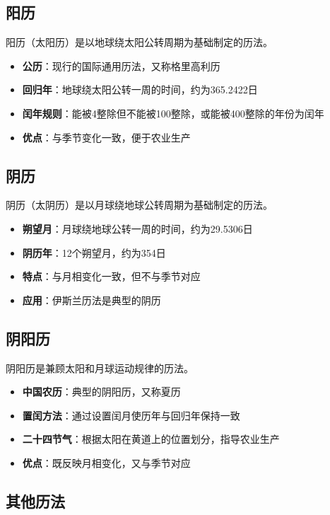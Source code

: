 \documentclass[12pt,UTF8]{ctexbook}
\begin{document}
\subsection{阳历}

阳历（太阳历）是以地球绕太阳公转周期为基础制定的历法。

\begin{itemize}
  \item \textbf{公历}：现行的国际通用历法，又称格里高利历
  \item \textbf{回归年}：地球绕太阳公转一周的时间，约为365.2422日
  \item \textbf{闰年规则}：能被4整除但不能被100整除，或能被400整除的年份为闰年
  \item \textbf{优点}：与季节变化一致，便于农业生产
\end{itemize}

\subsection{阴历}

阴历（太阴历）是以月球绕地球公转周期为基础制定的历法。

\begin{itemize}
  \item \textbf{朔望月}：月球绕地球公转一周的时间，约为29.5306日
  \item \textbf{阴历年}：12个朔望月，约为354日
  \item \textbf{特点}：与月相变化一致，但不与季节对应
  \item \textbf{应用}：伊斯兰历法是典型的阴历
\end{itemize}

\subsection{阴阳历}

阴阳历是兼顾太阳和月球运动规律的历法。

\begin{itemize}
  \item \textbf{中国农历}：典型的阴阳历，又称夏历
  \item \textbf{置闰方法}：通过设置闰月使历年与回归年保持一致
  \item \textbf{二十四节气}：根据太阳在黄道上的位置划分，指导农业生产
  \item \textbf{优点}：既反映月相变化，又与季节对应
\end{itemize}

\subsection{其他历法}
\end{document}

